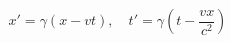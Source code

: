 \documentclass[preview]{standalone}
\begin{document}
\[
x' = \gamma (x - vt), \quad t' = \gamma \left(t - \frac{vx}{c^2}\right)
\]
\end{document}
